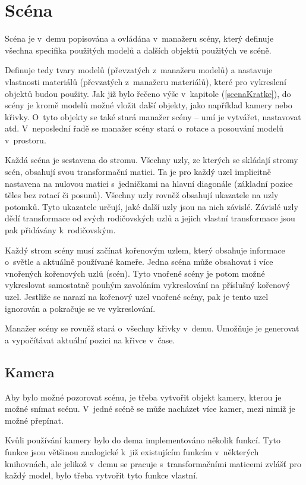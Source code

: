 \chapter{Scéna} \label{scena}
Scéna je v~demu popisována a ovládána v~manažeru scény, který definuje všechna specifika použitých modelů a dalších objektů použitých ve scéně.

Definuje tedy tvary modelů (převzatých z~manažeru modelů) a nastavuje vlastnosti materiálů (převzatých z~manažeru materiálů), které pro vykreslení objektů budou použity.
Jak již bylo řečeno výše v~kapitole (\ref{scenaKratke}), do scény je kromě modelů možné vložit další objekty, jako například kamery nebo křivky.
O~tyto objekty se také stará manažer scény -- umí je vytvářet, nastavovat atd.
V~neposlední řadě se manažer scény stará o~rotace a posouvání modelů v~prostoru.

Každá scéna je sestavena do stromu. 
Všechny uzly, ze kterých se skládají stromy scén, obsahují svou transformační matici.
Ta je pro každý uzel implicitně nastavena na nulovou matici s~jedničkami na hlavní diagonále (základní pozice těles bez rotací či posunů).
Všechny uzly rovněž obsahují ukazatele na uzly potomků.
Tyto ukazatele určují, jaké další uzly jsou na nich závislé.
Závislé uzly dědí transformace od svých rodičovských uzlů a jejich vlastní transformace jsou pak přidávány k~rodičovským.

Každý strom scény musí začínat kořenovým uzlem, který obsahuje informace o~světle a aktuálně používané kameře.
Jedna scéna může obsahovat i více vnořených kořenových uzlů (scén).
Tyto vnořené scény je potom možné vykreslovat samostatně pouhým zavoláním vykreslování na příslušný kořenový uzel.
Jestliže se narazí na kořenový uzel vnořené scény, pak je tento uzel ignorován a pokračuje se ve vykreslování.

Manažer scény se rovněž stará o~všechny křivky v~demu.
Umožňuje je generovat a vypočítávat aktuální pozici na křivce v~čase.

\section{Kamera}
Aby bylo možné pozorovat scénu, je třeba vytvořit objekt kamery, kterou je možné snímat scénu.
V~jedné scéně se může nacházet více kamer, mezi nimiž je možné přepínat.

Kvůli používání kamery bylo do dema implementováno několik funkcí.
Tyto funkce jsou většinou analogické k~již existujícím funkcím v~některých knihovnách, ale jelikož v~demu se pracuje s~transformačními maticemi zvlášť pro každý model, bylo třeba vytvořit tyto funkce vlastní.


